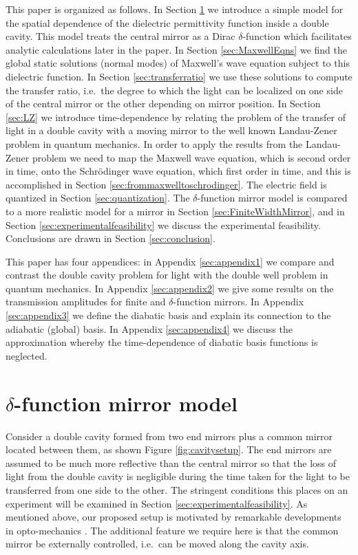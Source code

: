 \documentclass[twocolumn,english,pra,aps,superscriptaddress,floatfix]{revtex4-1}
\begin{document}
 
This paper is organized as follows. In Section \ref{sec:deltafunctionmirrormodel} we introduce a simple model for the spatial dependence of the dielectric permittivity function inside a double cavity. This model treats the central mirror as a Dirac $\delta$-function which facilitates analytic calculations later in the paper. In Section \ref{sec:MaxwellEqns} we find the global static solutions (normal modes) of Maxwell's wave equation subject to this dielectric function.  In Section \ref{sec:transferratio} we use these solutions to compute the transfer ratio, i.e.\ the degree to which the light can be localized on one side of the central mirror or the other
depending on mirror position. In Section \ref{sec:LZ} we introduce time-dependence by relating the problem of the transfer of light in a double cavity with a moving mirror to the well known Landau-Zener problem in quantum mechanics. In order to apply the results from the Landau-Zener problem we need to map the Maxwell wave equation, which is second order in time,  onto the  Schr\"{o}dinger wave equation, which first order in time, and this is accomplished in Section \ref{sec:frommaxwelltoschrodinger}. The electric field is quantized in Section \ref{sec:quantization}. The $\delta$-function mirror model is compared to a more realistic model for a mirror in Section \ref{sec:FiniteWidthMirror}, and in Section  \ref{sec:experimentalfeasibility} we discuss the experimental feasibility. Conclusions are drawn in Section \ref{sec:conclusion}. 

This paper has four appendices: in Appendix \ref{sec:appendix1} we compare and contrast the double cavity problem for light with the double well problem in quantum mechanics. In Appendix \ref{sec:appendix2} we give some results on the transmission amplitudes for finite and $\delta$-function mirrors. In Appendix \ref{sec:appendix3} we define the diabatic basis and explain its connection to the adiabatic (global) basis. In Appendix \ref{sec:appendix4} we discuss the approximation whereby the time-dependence of diabatic basis functions is neglected.


\section{$\delta$-function mirror model}
\label{sec:deltafunctionmirrormodel}


Consider a double cavity formed from two end mirrors plus a common mirror located between them, as shown Figure \ref{fig:cavitysetup}. The end mirrors are assumed to be much more reflective than the central mirror so that the loss of light from the double cavity is negligible during the time taken for the light to be transferred from one side to the other. The stringent conditions this places on an experiment will be examined in Section \ref{sec:experimentalfeasibility}. As mentioned above, our proposed setup is motivated by remarkable developments in opto-mechanics \cite{thompson08,jayich08}. The additional feature we require here is that the common mirror be externally controlled, i.e.\ can be moved along the cavity axis. 
\end{document}
